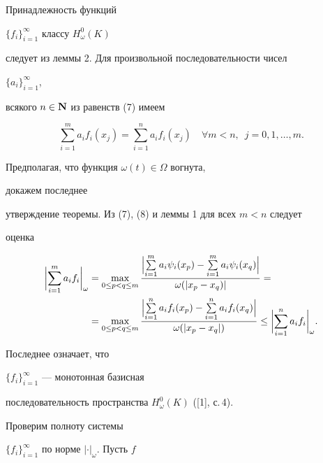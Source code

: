 \begin{pf} Принадлежность функций


$\{f_i\}^\infty_{i=1}$ классу $H^0_\omega(K)$


следует из леммы 2. Для произвольной последовательности чисел


$\{a_i\}^\infty_{i=1}$,


всякого $n\in\bold N$ из равенств (7) имеем


\begin{equation}


\sum^m_{i=1}a_i f_i(x_j)=\sum^n_{i=1}a_i f_i(x_j)


\quad \forall m<n,\ \; j=0,1,\dotsc,m.


\end{equation}


Предполагая, что функция $\omega(t)\in\Omega$ вогнута,


докажем последнее


утверждение теоремы. Из (7), (8) и леммы 1 для всех $m<n$ следует


оценка


\begin{align*}


\biggl|\sum^m_{i=1}a_i f_i \biggr|_\omega &=


\max_{0\le p<q\le m}


\frac{\Bigl|\sum\limits^m_{i=1}a_i\psi_i(x_p)-


\sum\limits^m_{i=1}a_i \psi_i(x_q)\Bigl|}


{\omega(|x_p-x_q)|} =\\


&= \max_{0\le p<q\le m}


\frac{\Bigl|\sum\limits^n_{i=1}a_i f_i(x_p)-


\sum\limits^n_{i=1}a_i f_i(x_q)\Bigr|}


{\omega(|x_p-x_q|)}


\le \biggl|\sum^n_{i=1}a_i f_i \biggr|_\omega.


\end{align*}


Последнее означает, что


$\{f_i\}^\infty_{i=1}$ --- монотонная базисная


последовательность пространства $H^0_\omega(K)$ ([1], с.\,4).





Проверим полноту системы


$\{f_i\}^\infty_{i=1}$ по норме $|\cdot|_\omega$. Пусть $f$



\end{pf}

